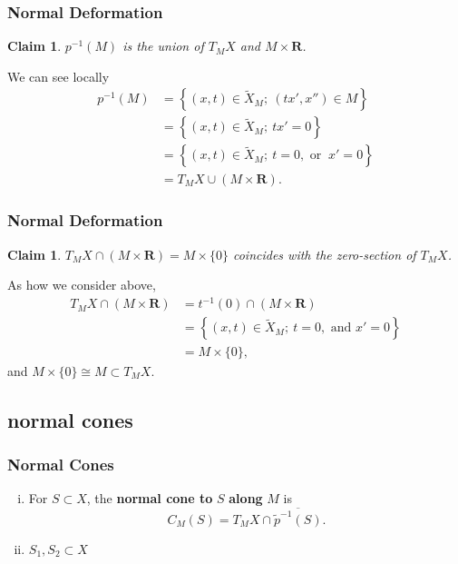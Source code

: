\documentclass[dvipdfmx,12pt,aspectratio=169,leqno]{beamer}%
\makeatletter
\renewcommand{\emph}[1]{{\upshape\bfseries #1}}
\newcommand{\rr}{\mathbf{R}}
\renewenvironment{proof}[1][\proofname]{\par
  \pushQED{\qed}%
  \normalfont \topsep6\p@\@plus6\p@\relax
  \trivlist
  \item[\hskip\labelsep
         \bfseries
    {#1}]\ignorespaces
}{%
  \popQED\endtrivlist\@endpefalse
}
\renewcommand{\proofname}{\textrm{Proof.}}
\numberwithin{equation}{subsection}
\theoremstyle{mystyle}
\newtheorem{CLM}[AXM]{Claim}
\makeatother
\begin{document}
\begin{frame}
    \frametitle{Normal Deformation}
    \begin{CLM}
        \(p^{-1}(M)\) is the union of \(T_{M}X\) 
        and \(M\times \rr\).
    \end{CLM}
    \begin{proof}
        We can see locally
        \begin{align*}
            p^{-1}(M)
            &=\left\{(x,t)\in\widetilde{X}_{M};~(tx',x'')\in M\right\}\\
            &=\left\{(x,t)\in\widetilde{X}_{M};~tx'=0\right\}\\
            &=\left\{(x,t)\in\widetilde{X}_{M};~t=0,\text{ or }~x'=0\right\}\\
            &=T_{M}X\cup (M\times \rr).
        \end{align*}
    \end{proof}
\end{frame}

\begin{frame}
    \frametitle{Normal Deformation}
    \begin{CLM}
        \(T_{M}X\cap (M\times \rr)=M\times\{0\}\) coincides 
        with the zero-section of \(T_{M}X\).
    \end{CLM}
    \begin{proof}
        As how we consider above,
        \begin{align*}
            T_{M}X\cap (M\times \rr)
            &=t^{-1}(0)\cap (M\times \rr)\\
            &=\left\{(x,t)\in\widetilde{X}_{M};~t=0,\text{ and }x'=0\right\}\\
            &=M\times\{0\},
        \end{align*}
        and \(
            M\times\{0\}\cong M \subset T_{M}X.
        \)
    \end{proof}
\end{frame}

\subsection{normal cones}
\begin{frame}
    \frametitle{Normal Cones}
    \begin{definition}[{\cite[Def.4.1.1]{KS90}}]
        \begin{enumerate}[(i)]
            \item For \(S\subset X\), the \emph{normal cone to} \(S\) \emph{along} \(M\) is\[
                C_{M}(S)=T_{M}X\cap\overline{\widetilde{p}^{-1}(S)}.
            \]
            \item \(S_1, S_2\subset X\)
        \end{enumerate}
    \end{definition}
\end{frame}
\end{document}
